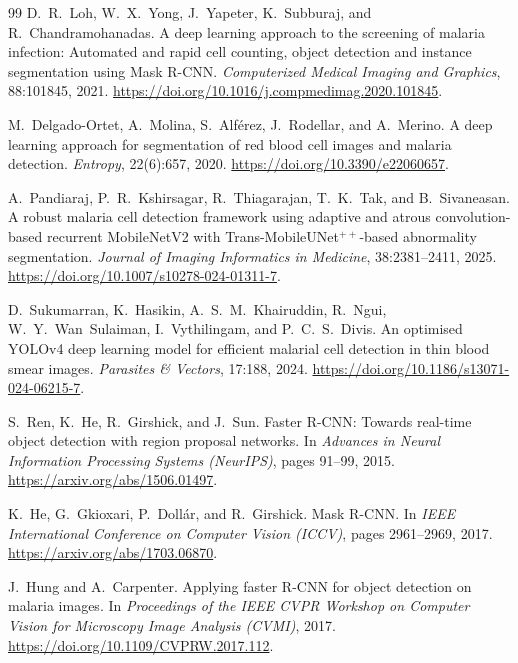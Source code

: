 \documentclass[10pt,twocolumn]{article}
\begin{document}
\begin{thebibliography}{99}
D.~R.~Loh, W.~X.~Yong, J.~Yapeter, K.~Subburaj, and R.~Chandramohanadas.
\newblock A deep learning approach to the screening of malaria infection:
  Automated and rapid cell counting, object detection and instance
  segmentation using {Mask R-CNN}.
\newblock \textit{Computerized Medical Imaging and Graphics}, 88:101845, 2021.
\newblock \url{https://doi.org/10.1016/j.compmedimag.2020.101845}.

M.~Delgado-Ortet, A.~Molina, S.~Alf\'{e}rez, J.~Rodellar, and A.~Merino.
\newblock A deep learning approach for segmentation of red blood cell images
  and malaria detection.
\newblock \textit{Entropy}, 22(6):657, 2020.
\newblock \url{https://doi.org/10.3390/e22060657}.

A.~Pandiaraj, P.~R.~Kshirsagar, R.~Thiagarajan, T.~K.~Tak, and B.~Sivaneasan.
\newblock A robust malaria cell detection framework using adaptive and atrous
  convolution-based recurrent {MobileNetV2} with {Trans-MobileUNet$^{++}$}-based
  abnormality segmentation.
\newblock \textit{Journal of Imaging Informatics in Medicine}, 38:2381--2411, 2025.
\newblock \url{https://doi.org/10.1007/s10278-024-01311-7}.

D.~Sukumarran, K.~Hasikin, A.~S.~M.~Khairuddin, R.~Ngui, W.~Y.~Wan~Sulaiman,
  I.~Vythilingam, and P.~C.~S.~Divis.
\newblock An optimised {YOLOv4} deep learning model for efficient malarial
  cell detection in thin blood smear images.
\newblock \textit{Parasites \& Vectors}, 17:188, 2024.
\newblock \url{https://doi.org/10.1186/s13071-024-06215-7}.

S.~Ren, K.~He, R.~Girshick, and J.~Sun.
\newblock Faster {R-CNN}: Towards real-time object detection with region
  proposal networks.
\newblock In \textit{Advances in Neural Information Processing Systems
  (NeurIPS)}, pages 91--99, 2015.
\newblock \url{https://arxiv.org/abs/1506.01497}.

K.~He, G.~Gkioxari, P.~Doll{\'{a}}r, and R.~Girshick.
\newblock Mask {R-CNN}.
\newblock In \textit{IEEE International Conference on Computer Vision (ICCV)},
  pages 2961--2969, 2017.
\newblock \url{https://arxiv.org/abs/1703.06870}.

J.~Hung and A.~Carpenter.
\newblock Applying faster {R-CNN} for object detection on malaria images.
\newblock In \textit{Proceedings of the IEEE CVPR Workshop on Computer Vision
  for Microscopy Image Analysis (CVMI)}, 2017.
\newblock \url{https://doi.org/10.1109/CVPRW.2017.112}.


\end{thebibliography}
\end{document}
